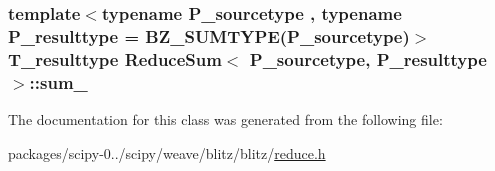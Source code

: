 \subsubsection[{sum\+\_\+}]{\setlength{\rightskip}{0pt plus 5cm}template$<$typename P\+\_\+sourcetype , typename P\+\_\+resulttype  = B\+Z\+\_\+\+S\+U\+M\+T\+Y\+P\+E(\+P\+\_\+sourcetype)$>$ {\bf T\+\_\+resulttype} {\bf Reduce\+Sum}$<$ P\+\_\+sourcetype, P\+\_\+resulttype $>$\+::sum\+\_\+\hspace{0.3cm}{\ttfamily [protected]}}\label{classReduceSum_a376d084caf4136d445dbf36f60132dbc}


The documentation for this class was generated from the following file\+:\begin{DoxyCompactItemize}
\item 
packages/scipy-\/0../scipy/weave/blitz/blitz/\hyperlink{reduce_8h}{reduce.\+h}\end{DoxyCompactItemize}
